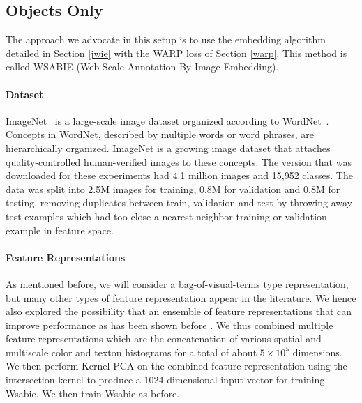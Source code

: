 \subsection{Objects Only}\label{sec:oos}

The approach we advocate in this setup is to use the embedding
algorithm detailed in Section \ref{jwie} with the WARP loss of Section
\ref{warp}.  This method is called {\sc WSABIE} (Web Scale Annotation
By Image Embedding).




\paragraph{Dataset}

ImageNet~\citep{imagenet_cvpr09}
is a large-scale image dataset organized according to WordNet~\citep{wordnet:1998}.
Concepts in WordNet, described by multiple words or word phrases, are
hierarchically organized. ImageNet is a growing image dataset that attaches
quality-controlled human-verified images to  these concepts.
The version that was downloaded for these experiments had 
4.1 million images and 15,952 classes.
The data was split into 2.5M images for training, 0.8M for validation and
0.8M for testing, removing duplicates between train, validation and test
by throwing away test examples which had too close a nearest neighbor training
or validation example in feature space.

\paragraph{Feature Representations}

As mentioned before, we will consider a bag-of-visual-terms type representation,
but many other types of feature representation appear in the literature.
We hence also explored the possibility that an ensemble of feature representations that can 
improve performance as has been shown before \citep{makadia:2008}.
We thus combined multiple feature representations which are the
 concatenation of various spatial \citep{pyramid} and multiscale color and
texton histograms \citep{textons}
for a total of about $5 \times 10^5$ dimensions.
We then perform Kernel PCA \citep{kpca} on the combined feature representation using the intersection
kernel \citep{intersection-kernel} 
to produce a 1024 dimensional input vector for training {\sc Wsabie}. We then train {\sc Wsabie} as before.



